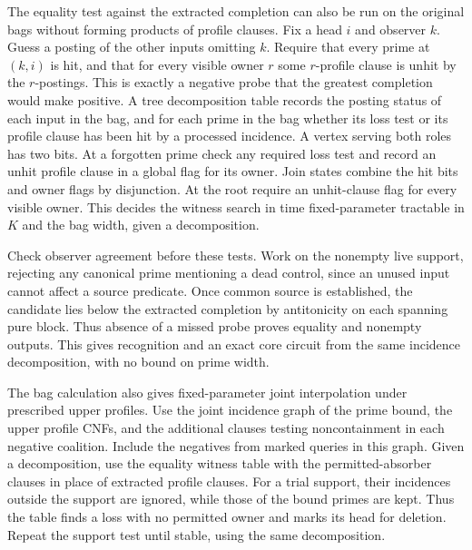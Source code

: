 The equality test against the extracted completion can
also be run on the original bags without forming products
of profile clauses. Fix a head $i$ and observer $k$.
Guess a posting of the other inputs omitting $k$. Require
that every prime at $(k,i)$ is hit, and that for every
visible owner $r$ some $r$-profile clause is unhit by the
$r$-postings. This is exactly a negative probe that the
greatest completion would make positive. A tree
decomposition table records the posting status of each
input in the bag, and for each prime in the bag whether
its loss test or its profile clause has been hit by a
processed incidence. A vertex serving both roles has
two bits. At a forgotten prime check any required loss
test and record an unhit profile clause in a global
flag for its owner. Join states combine the hit bits
and owner flags by disjunction. At the root require
an unhit-clause flag for every visible owner. This
decides the witness search in time fixed-parameter
tractable in $K$ and the bag width, given a decomposition.

Check observer agreement before these tests. Work on
the nonempty live support, rejecting any canonical
prime mentioning a dead control, since an unused input
cannot affect a source predicate. Once common source
is established, the candidate lies
below the extracted completion by antitonicity on
each spanning pure block. Thus absence of a missed
probe proves equality and nonempty outputs. This
gives recognition and an exact core circuit from
the same incidence decomposition, with no bound on
prime width.

The bag calculation also gives fixed-parameter joint
interpolation under prescribed upper profiles. Use
the joint incidence graph of the prime bound, the
upper profile CNFs, and the additional clauses
testing noncontainment in each negative coalition.
Include the negatives from marked queries in this
graph. Given a decomposition, use the equality
witness table with the permitted-absorber clauses
in place of extracted profile clauses. For a trial
support, their incidences outside the support are
ignored, while those of the bound primes are kept.
Thus the table finds a loss with no permitted owner
and marks its head for deletion. Repeat the support
test until stable, using the same decomposition.

